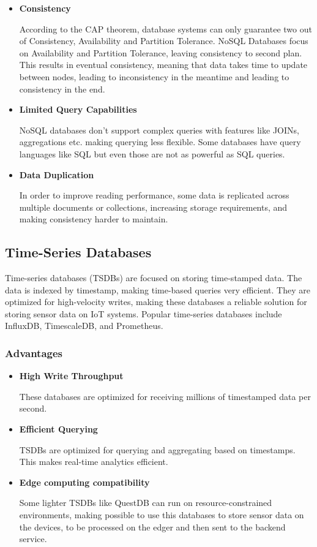 \begin{itemize}
	\item \textbf{Consistency}

	      According to the CAP theorem, database systems can only guarantee two out of
	      Consistency, Availability and Partition Tolerance. NoSQL Databases focus on
	      Availability and Partition Tolerance, leaving consistency to second plan.
	      This results in eventual consistency, meaning that data takes time to update
	      between nodes, leading to inconsistency in the meantime and leading to
	      consistency in the end.

	\item \textbf{Limited Query Capabilities}

	      NoSQL databases don't support complex queries with features like JOINs,
	      aggregations etc. making querying less flexible. Some databases have query
	      languages like SQL but even those are not as powerful as SQL queries.

	\item \textbf{Data Duplication}

	      In order to improve reading performance, some data is replicated across
	      multiple documents or collections, increasing storage requirements, and
	      making consistency harder to maintain.
\end{itemize}
\subsection{Time-Series Databases}
Time-series databases (TSDBs) are focused on storing time-stamped data. The
data is indexed by timestamp, making time-based queries very efficient. They are
optimized for high-velocity writes, making these databases a reliable solution
for storing sensor data on IoT systems. Popular time-series databases include
InfluxDB, TimescaleDB, and Prometheus.

\subsubsection{Advantages}
\begin{itemize}
	\item \textbf{High Write Throughput}

	      These databases are optimized for receiving millions of timestamped data
	      per second.

	\item \textbf{Efficient Querying}

	      TSDBs are optimized for querying and aggregating based on timestamps. This
	      makes real-time analytics efficient.

	\item \textbf{Edge computing compatibility}

	      Some lighter TSDBs like QuestDB can run on resource-constrained environments,
	      making possible to use this databases to store sensor data on the devices,
	      to be processed on the edger and then sent to the backend service.

\end{itemize}
